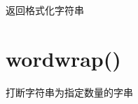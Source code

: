 返回格式化字符串

\section{wordwrap()}


打断字符串为指定数量的字串























































































